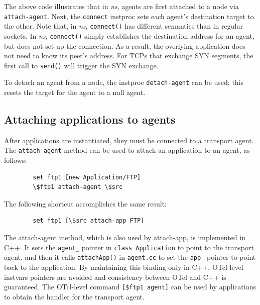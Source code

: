 The above code illustrates that in \emph{ns}, agents are first attached to a node
via {\tt attach-agent}.  Next, the {\tt connect} instproc sets each agent's
destination target to the other.  Note that, in \emph{ns}, {\tt connect()} has
different semantics than in regular sockets.  In \emph{ns}, {\tt connect()} simply
establishes the destination address for an agent, but does not set up the
connection.  As a result, the overlying application does not need to know
its peer's address.  For TCPs that exchange SYN segments, the first call to 
{\tt send()} will trigger the SYN exchange. 

To detach an agent from a node, the instproc {\tt detach-agent} can be 
used; this resets the target for the agent to a null agent.

\subsection{Attaching applications to agents}
\label{sec:attachappagent}

After applications are instantiated, they must be connected to a transport
agent.  The {\tt attach-agent} method can be used to attach an application
to an agent, as follows:
\begin{verbatim}
        set ftp1 [new Application/FTP]
        \$ftp1 attach-agent \$src
\end{verbatim}

The following shortcut accomplishes the same result:
\begin{verbatim}
        set ftp1 [\$src attach-app FTP]
\end{verbatim}

The attach-agent method, which is also used by attach-app, is implemented in 
C++.  It sets the {\tt agent\_}
pointer in {\tt class Application} to point to the transport agent, and then
it calls {\tt attachApp()} in {\tt agent.cc} to set the {\tt app\_} pointer
to point back to the application.  By maintaining this binding only in C++,
OTcl-level instvars pointers are avoided and consistency between OTcl and C++ 
is guaranteed.  The OTcl-level command {\tt [\$ftp1 agent]} can be used by 
applications to obtain the handler for the transport agent.

